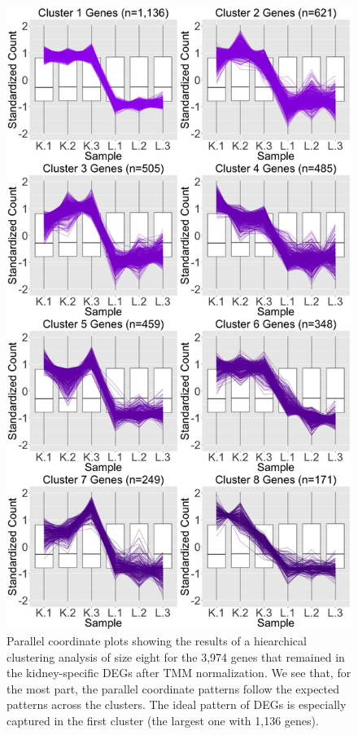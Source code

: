 \documentclass{article}
\begin{document}
\begin{figure}[!p]
\centerline{\includegraphics[width=1\columnwidth]{../Bioinformatics/Pictures/liverKidney/Clustering_data_FDR_001_TMMvRaw_Keep/K_L_8.jpg}}
\caption{Parallel coordinate plots showing the results of a hiearchical clustering analysis of size eight for the 3,974 genes that remained in the kidney-specific DEGs after TMM normalization. We see that, for the most part, the parallel coordinate patterns follow the expected patterns across the clusters. The ideal pattern of DEGs is especially captured in the first cluster (the largest one with 1,136 genes).
\label{KeepPCP}}
\end{figure}
\end{document}
